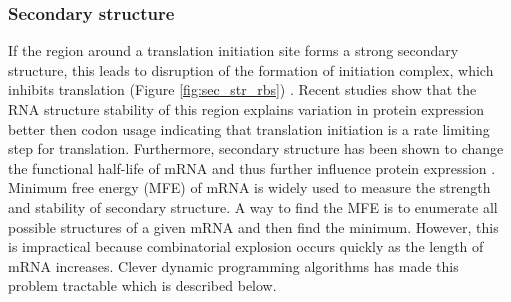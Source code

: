 \subsubsection{Secondary structure}
If the region around a translation initiation site forms a strong secondary structure, this leads to disruption of the formation of initiation complex, which inhibits translation (Figure \ref{fig:sec_str_rbs}) \cite{Kudla2009-tl, Espah_Borujeni2014-vy, Tuller2015-ts}. Recent studies show that the RNA structure stability of this region explains variation in protein expression better then codon usage \cite{Kudla2009-tl, Plotkin2011-ak, Cambray2018-kn} indicating that translation initiation is a rate limiting step for translation. Furthermore, secondary structure has been shown to change the functional half-life of mRNA and thus further influence protein expression \cite{mauger2019mrna}. Minimum free energy (MFE) of mRNA is widely used to measure the strength and stability of secondary structure. A way to find the MFE is to enumerate all possible structures of a given mRNA and then find the minimum. However, this is impractical because combinatorial explosion occurs quickly as the length of mRNA increases. Clever dynamic programming algorithms has made this problem tractable which is described below.


